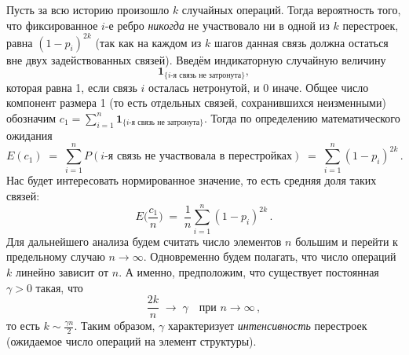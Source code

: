 Пусть за всю историю произошло $k$ случайных операций. Тогда вероятность того, что фиксированное $i$-е ребро \emph{никогда} не участвовало ни в одной из $k$ перестроек, равна $(1 - p_i)^{2k}$ (так как на каждом из $k$ шагов данная связь должна остаться вне двух задействованных связей). Введём индикаторную случайную величину 
$$\mathbf{1}_{\{\text{$i$-я связь не затронута}\}},$$
которая равна 1, если связь $i$ осталась нетронутой, и 0 иначе. Общее число компонент размера 1 (то есть отдельных связей, сохранившихся неизменными) обозначим $c_1 = \sum_{i=1}^n \mathbf{1}_{\{\text{$i$-я связь не затронута}\}}$. Тогда по определению математического ожидания
\[
E(c_1) \;=\; \sum_{i=1}^n P(\text{$i$-я связь не участвовала в перестройках}) \;=\; \sum_{i=1}^n (1 - p_i)^{2k} \,. 
\]
Нас будет интересовать нормированное значение, то есть средняя доля таких связей:
\[
E\!\Big(\frac{c_1}{n}\Big) \;=\; \frac{1}{n} \sum_{i=1}^n (1 - p_i)^{2k} \,.
\]
Для дальнейшего анализа будем считать число элементов $n$ большим и перейти к предельному случаю $n \to \infty$. Одновременно будем полагать, что число операций $k$ линейно зависит от $n$. А именно, предположим, что существует постоянная $\gamma > 0$ такая, что 
\[
\frac{2k}{n} \;\to\; \gamma \quad \text{при } n \to \infty\,,
\] 
то есть $k \sim \frac{\gamma n}{2}$. Таким образом, $\gamma$ характеризует \emph{интенсивность} перестроек (ожидаемое число операций на элемент структуры).

